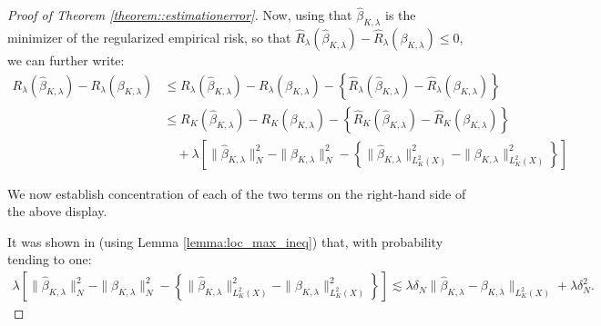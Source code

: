 \documentclass[11pt]{article}
\theoremstyle{plain}
\theoremstyle{definition}
\theoremstyle{remark}
\theoremstyle{definition}
\begin{document}
\begin{proof}[Proof of Theorem \ref{theorem::estimationerror}]
Now, using that $\widehat{\beta}_{K,\lambda}$ is the minimizer of the regularized empirical risk, so that $\widehat{R}_{\lambda}(\widehat{\beta}_{K,\lambda}) - \widehat{R}_{\lambda}(\beta_{K,\lambda}) \leq 0$, we can further write:
\begin{align*}
     R_{\lambda}(\widehat{\beta}_{K,\lambda}) - R_{\lambda}(\beta_{K,\lambda}) &\leq  R_{\lambda}(\widehat{\beta}_{K,\lambda}) - R_{\lambda}(\beta_{K,\lambda}) - \left\{ \widehat{R}_{\lambda}(\widehat{\beta}_{K,\lambda}) - \widehat{R}_{\lambda}(\beta_{K,\lambda}) \right\}\\
      &\leq  R_{K}(\widehat{\beta}_{K,\lambda}) - R_{K}(\beta_{K,\lambda}) - \left\{ \widehat{R}_{K}(\widehat{\beta}_{K,\lambda}) - \widehat{R}_{K}(\beta_{K,\lambda}) \right\} \\
      & \quad  + \lambda \left[\|\widehat{\beta}_{K,\lambda}\|^2_N - \|\beta_{K,\lambda}\|^2_N - \left\{\|\widehat{\beta}_{K,\lambda}\|^2_{L^2_K(X)} - \|\beta_{K,\lambda}\|^2_{L^2_K(X)}\right\} \right]
\end{align*}


 

We now establish concentration of each of the two terms on the right-hand side of the above display. %



It was shown in \cite{bibaut2024nonparametric} (using Lemma \ref{lemma:loc_max_ineq}) that, with probability tending to one:
\begin{align}
    \label{eqn::regtermconc}\lambda \left[\|\widehat{\beta}_{K,\lambda}\|^2_N - \|\beta_{K,\lambda}\|^2_N - \left\{\|\widehat{\beta}_{K,\lambda}\|^2_{L^2_K(X)} - \|\beta_{K,\lambda}\|^2_{L^2_K(X)}\right\} \right] \lesssim \lambda \delta_N \|\widehat{\beta}_{K,\lambda} - \beta_{K,\lambda}\|_{L^2_K(X)} + \lambda \delta_N^2.  
\end{align}





\end{proof}
\end{document}
